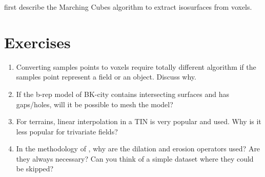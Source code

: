 \citet{Lorensen87} first describe the Marching Cubes algorithm to extract isosurfaces from voxels.

%
\section{Exercises}

\begin{enumerate}
  \item Converting samples points to voxels require totally different algorithm if the samples point represent a field or an object. Discuss why.
  \item If the b-rep model of BK-city contains intersecting surfaces and has gaps/holes, will it be possible to mesh the model?
  \item For terrains, linear interpolation in a TIN is very popular and used. Why is it less popular for trivariate fields?
  \item In the methodology of \citet{Donkers16}, why are the dilation and erosion operators used? Are they always necessary? Can you think of a simple dataset where they could be skipped?
\end{enumerate}








